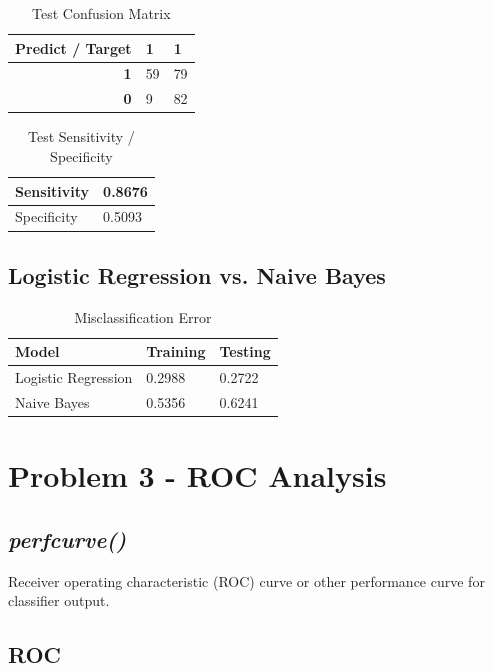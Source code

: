\documentclass[12pt, letterpaper]{report}
\begin{document}
\begin{table}[H]
	\centering
	\begin{tabular}{ |r|l|l| }
		\hline
		\textbf{Predict / Target} & \textbf{1} & \textbf{1} \\
		\hline
		\textbf{1} & 59 & 79 \\
		\hline
		\textbf{0} & 9 & 82 \\
		\hline
	\end{tabular}
	\caption{Test Confusion Matrix}
\end{table}

\begin{table}[H]
	\centering
	\begin{tabular}{ |l|l| }
		\hline
		Sensitivity & 0.8676 \\
		\hline
		Specificity & 0.5093 \\
		\hline
	\end{tabular}
	\caption{Test Sensitivity / Specificity}
\end{table}


\subsection{Logistic Regression vs. Naive Bayes}

\begin{table}[H]
	\centering
	\begin{tabular}{ |l|l|l| }
		\hline
		\textbf{Model} & \textbf{Training} & \textbf{Testing} \\
		\hline
		Logistic Regression & 0.2988 & 0.2722 \\
		\hline
		Naive Bayes & 0.5356 & 0.6241 \\
		\hline
	\end{tabular}
	\caption{Misclassification Error}
\end{table}

\section{Problem 3 - ROC Analysis}

\subsection{\textit{perfcurve()}}

Receiver operating characteristic (ROC) curve or other performance curve for classifier output.

\subsection{ROC}
\end{document}

